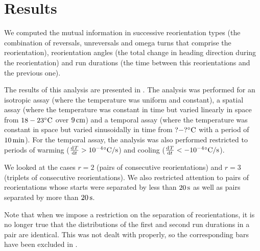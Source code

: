 \documentclass[12pt]{article}
\begin{document}
\section{Results}\label{sec:results}

We computed the mutual information in successive reorientation types (the combination of reversals, unreversals and omega turns that comprise the reorientation), reorientation angles (the total change in heading direction during the reorientation)  and run durations (the time between this reorientations and the previous one).

The results of this analysis are presented in . The analysis was performed for an isotropic assay (where the temperature was uniform and constant), a spatial assay (where the temperature was constant in time but varied linearly in space from $18-23^\circ\mathrm{C}$ over $9\,\mathrm{cm}$) and a temporal assay (where the temperature was constant in space but varied sinusoidally in time from $?-?^\circ\mathrm{C}$ with a period of $10\,\mathrm{min}$). For the temporal assay, the analysis was also performed restricted to periods of warming ($\diff{T}{t} > 10^{-4}\mbox{}\dC/\mathrm{s}$) and cooling ($\diff{T}{t} < -10^{-4}\mbox{}\dC/\mathrm{s}$).

We looked at the cases $r=2$ (pairs of consecutive reorientations) and $r=3$ (triplets of consecutive reorientations). We also restricted attention to pairs of reorientations whose starts were separated by less than $20\,\mathrm{s}$ as well as pairs separated by more than $20\,\mathrm{s}$.

Note that when we impose a restriction on the separation of reorientations, it is no longer true that the distributions of the first and second run durations in a pair are identical. This was not dealt with properly, so the corresponding bars have been excluded in .

\end{document}
